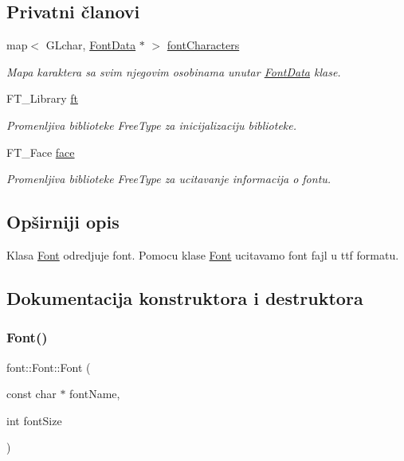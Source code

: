 \subsection*{Privatni članovi}
\begin{DoxyCompactItemize}
\item 
map$<$ G\+Lchar, \hyperlink{classfont_1_1FontData}{Font\+Data} $\ast$ $>$ \hyperlink{classfont_1_1Font_a8c7aa4a1fef0409f481b7bda30b1269e}{font\+Characters}
\begin{DoxyCompactList}\small\item\em Mapa karaktera sa svim njegovim osobinama unutar \hyperlink{classfont_1_1FontData}{Font\+Data} klase. \end{DoxyCompactList}\item 
F\+T\+\_\+\+Library \hyperlink{classfont_1_1Font_a18b0337c00acccf27f72250100f2a1f1}{ft}
\begin{DoxyCompactList}\small\item\em Promenljiva biblioteke Free\+Type za inicijalizaciju biblioteke. \end{DoxyCompactList}\item 
F\+T\+\_\+\+Face \hyperlink{classfont_1_1Font_a1217a07286461eceda8467479619ec2e}{face}
\begin{DoxyCompactList}\small\item\em Promenljiva biblioteke Free\+Type za ucitavanje informacija o fontu. \end{DoxyCompactList}\end{DoxyCompactItemize}


\subsection{Opširniji opis}
Klasa \hyperlink{classfont_1_1Font}{Font} odredjuje font. Pomocu klase \hyperlink{classfont_1_1Font}{Font} ucitavamo font fajl u ttf formatu. 

\subsection{Dokumentacija konstruktora i destruktora}
\mbox{\label{classfont_1_1Font_aed65c4302c3fe8426e60a6809ae766c1}} 
\subsubsection{\texorpdfstring{Font()}{Font()}}
{\footnotesize\ttfamily font\+::\+Font\+::\+Font (\begin{DoxyParamCaption}\item[{const char $\ast$}]{font\+Name,  }\item[{int}]{font\+Size }\end{DoxyParamCaption})}



